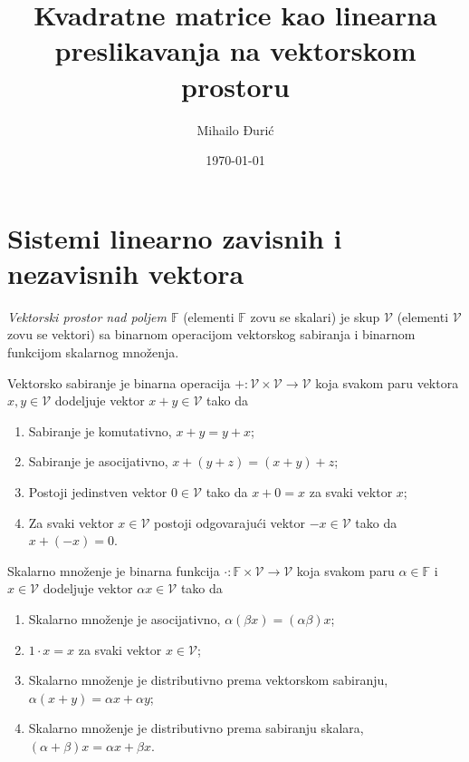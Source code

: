 \documentclass{article}
\title{Kvadratne matrice kao linearna preslikavanja na vektorskom prostoru}
\author{Mihailo Đurić}
\date{\today}
\begin{document}
\maketitle
\tableofcontents
\newpage

\section{Sistemi linearno zavisnih i nezavisnih vektora}

\begin{definition}
  \textit{Vektorski prostor nad poljem $\mathbb{F}$} (elementi $\mathbb{F}$ zovu se skalari) je skup $\mathcal{V}$ (elementi $\mathcal{V}$ zovu se vektori) sa binarnom operacijom vektorskog sabiranja i binarnom funkcijom skalarnog množenja.

  Vektorsko sabiranje je binarna operacija $+ : \mathcal{V} \times \mathcal{V} \to \mathcal{V}$ koja svakom paru vektora $x, y \in \mathcal{V}$ dodeljuje vektor $x + y \in \mathcal{V}$ tako da
  \begin{enumerate}
    \item Sabiranje je komutativno, $x + y = y + x$;
    \item Sabiranje je asocijativno, $x + (y + z) = (x + y) + z$;
    \item Postoji jedinstven vektor $0 \in \mathcal{V}$ tako da $x + 0 = x$ za svaki vektor $x$;
    \item Za svaki vektor $x \in \mathcal{V}$ postoji odgovarajući vektor $-x \in \mathcal{V}$ tako da $x + (-x) = 0$.
  \end{enumerate}
  
  Skalarno množenje je binarna funkcija $\cdot : \mathbb{F} \times \mathcal{V} \to \mathcal{V}$ koja svakom paru $\alpha \in \mathbb{F}$ i $x \in \mathcal{V}$ dodeljuje vektor $\alpha x \in \mathcal{V}$ tako da
  \begin{enumerate}
    \item Skalarno množenje je asocijativno, $\alpha (\beta x) = (\alpha \beta) x$;
    \item $1 \cdot x = x$ za svaki vektor $x \in \mathcal{V}$;
    \item Skalarno množenje je distributivno prema vektorskom sabiranju, $\alpha (x + y) = \alpha x + \alpha y$;
    \item Skalarno množenje je distributivno prema sabiranju skalara, $(\alpha + \beta) x = \alpha x + \beta x$.
  \end{enumerate}
\end{definition}
\end{document}
